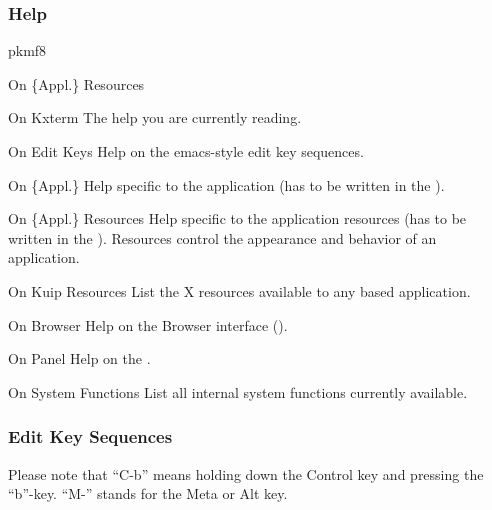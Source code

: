 \subsubsection*{Help}
\begin{PICTf}{pkmf8}
\begin{DLsf}{On \{Appl.\} Resources}
\item[On Kxterm]
         The help you are currently reading.
\item[On Edit Keys]
         Help on the emacs-style edit key sequences.
\item[On \{Appl.\}]
         Help specific to the application (has to be written
         in the \CDF{}).
\item[On \{Appl.\} Resources]
         Help specific to the application resources
         (has to be written in the \CDF{}).
         Resources control the appearance and behavior of an application.
\item[On Kuip Resources]
         List the X resources available to any \KUIPMotif{} 
         based application. 
\item[On Browser]
         Help on the \KUIPMotif{} Browser interface (\MB{}).
\item[On Panel]
         Help on the \KUIPMotif{} \PNI{}.
\item[On System Functions]
         List all \KUIP{} internal system functions currently available.
\end{DLsf}
\end{PICTf}


\subsubsection{Edit Key Sequences}
\label{ref:reedkey}

Please note that ``C-b'' means holding down the 
Control key and pressing the ``b''-key. 
``M-'' stands for the Meta or Alt key.

